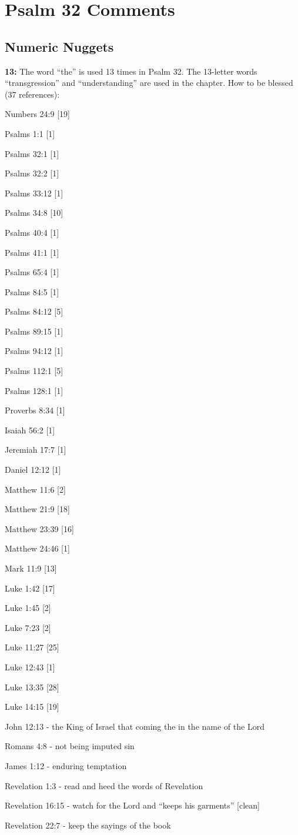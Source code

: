 \section{Psalm 32 Comments}

\subsection{Numeric Nuggets}
\textbf{13: } The word ``the'' is used 13 times in Psalm 32.  The 13-letter words ``transgression'' and ``understanding'' are used in the chapter. How to be blessed (37 references):
\begin{compactenum}
	\item Numbers 24:9 [19]
	\item Psalms 1:1 [1]
	\item Psalms 32:1 [1]
	\item Psalms 32:2 [1]
	\item Psalms 33:12 [1]
	\item Psalms 34:8 [10]
	\item Psalms 40:4 [1]
	\item Psalms 41:1 [1]
	\item Psalms 65:4 [1]
	\item Psalms 84:5 [1]
	\item Psalms 84:12 [5]
	\item Psalms 89:15 [1]
	\item Psalms 94:12 [1]
	\item Psalms 112:1 [5]
	\item Psalms 128:1 [1]
	\item Proverbs 8:34 [1]
	\item Isaiah 56:2 [1]
	\item Jeremiah 17:7 [1]
	\item Daniel 12:12 [1]
	\item  Matthew 11:6 [2]
	\item  Matthew 21:9 [18]
	\item  Matthew 23:39 [16]
	\item Matthew 24:46 [1]
	\item Mark 11:9 [13]
	\item Luke 1:42 [17]
	\item Luke 1:45 [2]
	\item Luke 7:23 [2]
	\item Luke 11:27 [25]
	\item Luke 12:43 [1]
	\item Luke 13:35 [28]
	\item Luke 14:15 [19]
	\item John 12:13 - the King of Israel that  coming the in the name of the Lord
	\item Romans 4:8 - not being imputed sin
	\item James 1:12 - enduring temptation
	\item Revelation 1:3 - read and heed the words of Revelation
	\item Revelation 16:15 - watch for the Lord and ``keeps his garments'' [clean]
	\item Revelation 22:7 - keep the sayings of the book
\end{compactenum}

